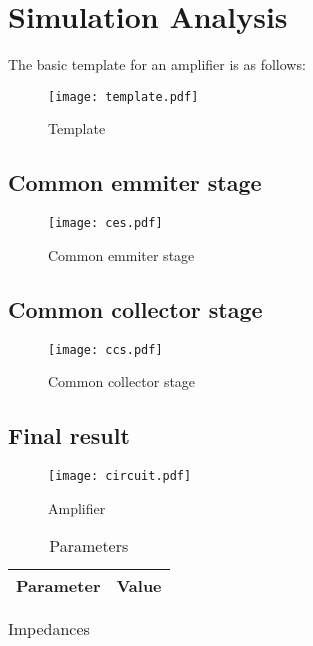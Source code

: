 \newpage

\section{Simulation Analysis}
\label{sec:simulation}

The basic template for an amplifier is as follows:

\begin{figure}[H]
        \centering
        \texttt{[image: template.pdf]}
        \caption{Template}
        \label{template}
\end{figure}

\subsection{Common emmiter stage}

\begin{figure}[H]
        \centering
        \texttt{[image: ces.pdf]}
        \caption{Common emmiter stage}
        \label{ces}
\end{figure}

\subsection{Common collector stage}

\begin{figure}[H]
        \centering
        \texttt{[image: ccs.pdf]}
        \caption{Common collector stage}
        \label{ccs}
\end{figure}

\subsection{Final result}

\begin{figure}[H]
        \centering
        \texttt{[image: circuit.pdf]}
        \caption{Amplifier}
        \label{circuit}
\end{figure}

\begin{table}[H]
        \centering
        \begin{tabular}{|c|c|}
        \hline
        Parameter & Value \\
        \hline
        
        \hline
        \end{tabular}
        \caption{Parameters}
        \label{param}
\end{table}

\begin{table}[H]
  \centering
  \begin{tabular}{|c|c|}
    \hline
        
        \hline
  \end{tabular}
  \caption{Impedances}
  \label{tab:sim_imp}
\end{table}

